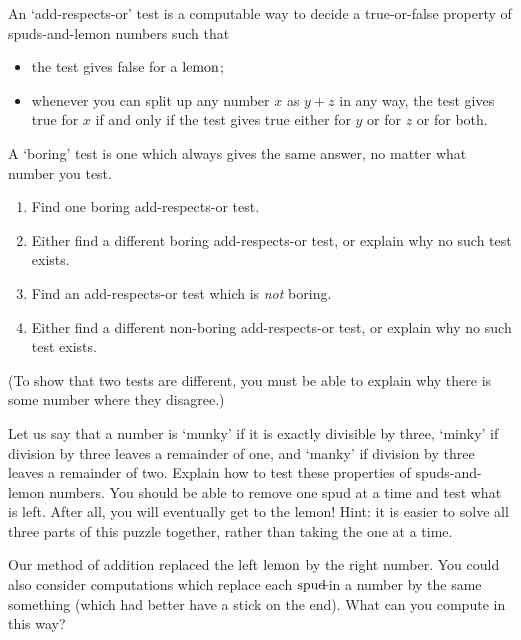 \documentclass{book}
\begin{document}
\begin{puz}
  An `add-respects-or' test is a computable way to decide a true-or-false property of spuds-and-lemon numbers such that
  \begin{itemize}
  \item the test gives false for a $\mbox{lemon}$;
    \item whenever you can split up any number $x$ as $y+z$ in any way, the test gives true for $x$ if and only if the test gives true either for $y$ or for $z$ or for both.
  \end{itemize}
  A `boring' test is one which always gives the same answer, no matter what number you test.
  \begin{enumerate}
  \item Find one boring add-respects-or test.
  \item Either find a different boring add-respects-or test, or explain why no such test exists.
  \item Find an add-respects-or test which is \emph{not} boring.
  \item Either find a different non-boring add-respects-or test, or explain why no such test exists.
  \end{enumerate}
(To show that two tests are different, you must be able to explain why there is some number where they disagree.)
\end{puz}

\begin{puz}
 Let us say that a number is `munky' if it is exactly divisible by three, `minky' if division by three leaves a remainder of one, and `manky' if division by three leaves a remainder of two. Explain how to test these properties of spuds-and-lemon numbers. You should be able to remove one spud at a time and test what is left. After all, you will eventually get to the lemon! Hint: it is easier to solve all three parts of this puzzle together, rather than taking the one at a time.
\end{puz}

\begin{puz}
Our method of addition replaced the left $\mbox{lemon}$ by the right number. You could also consider computations which replace each $\mbox{spud}\!\!\!-\!\!\!$ in a number by the same something (which had better have a stick on the end). What can you compute in this way?
\end{puz}
\end{document}
